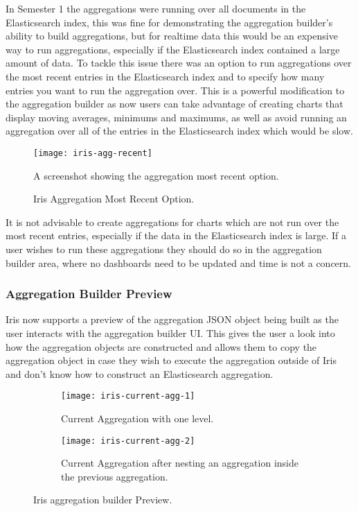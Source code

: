 \documentclass[12pt,a4paper,titlepage]{report}
\begin{document}
In Semester 1 the aggregations were running over all documents in the Elasticsearch index, this was fine for demonstrating the aggregation builder's ability to build aggregations, but for realtime data this would be an expensive way to run aggregations, especially if the Elasticsearch index contained a large amount of data. To tackle this issue there was an option to run aggregations over the most recent entries in the Elasticsearch index and to specify how many entries you want to run the aggregation over. This is a powerful modification to the aggregation builder as now users can take advantage of creating charts that display moving averages, minimums and maximums, as well as avoid running an aggregation over all of the entries in the Elasticsearch index which would be slow. 
\begin{figure}[H]
\begin{tcolorbox}
\begin{center}
\texttt{[image: iris-agg-recent]}
\end{center}
A screenshot showing the aggregation most recent option.
\end{tcolorbox}
\caption{Iris Aggregation Most Recent Option.}
\end{figure}

It is not advisable to create aggregations for charts which are not run over the most recent entries, especially if the data in the Elasticsearch index is large. If a user wishes to run these aggregations they should do so in the aggregation builder area, where no dashboards need to be updated and time is not a concern.

\subsubsection{Aggregation Builder Preview}
Iris now supports a preview of the aggregation JSON object being built as the user interacts with the aggregation builder UI. This gives the user a look into how the aggregation objects are constructed and allows them to copy the aggregation object in case they wish to execute the aggregation outside of Iris and don't know how to construct an Elasticsearch aggregation.
\begin{figure}[H]
\begin{tcolorbox}
\begin{center}
\begin{subfigure}{0.5\textwidth}
\centering
\texttt{[image: iris-current-agg-1]}
\caption{Current Aggregation with one level.}
\end{subfigure}%
\begin{subfigure}{0.5\textwidth}
\centering
\texttt{[image: iris-current-agg-2]}
\caption{Current Aggregation after nesting an aggregation inside the previous aggregation.}
\end{subfigure}
\end{center}
\end{tcolorbox}
\caption{Iris aggregation builder Preview.}
\end{figure}
\end{document}
